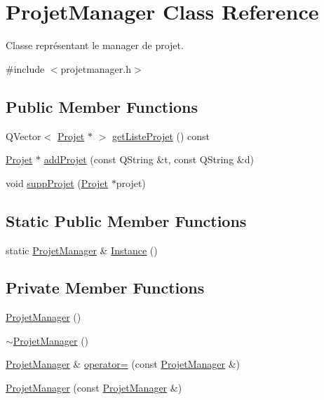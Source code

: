 \hypertarget{class_projet_manager}{}\section{Projet\+Manager Class Reference}
\label{class_projet_manager}


Classe représentant le manager de projet.  




{\ttfamily \#include $<$projetmanager.\+h$>$}

\subsection*{Public Member Functions}
\begin{DoxyCompactItemize}
\item 
Q\+Vector$<$ \hyperlink{class_projet}{Projet} $\ast$ $>$ \hyperlink{class_projet_manager_a2b7281842b818a8e2cd85a81ef270930}{get\+Liste\+Projet} () const 
\item 
\hyperlink{class_projet}{Projet} $\ast$ \hyperlink{class_projet_manager_a1c547839afb77faaa3eb2f37e0c869a7}{add\+Projet} (const Q\+String \&t, const Q\+String \&d)
\item 
void \hyperlink{class_projet_manager_a7c76e23d621d3e904e3e2a1bdc4c176c}{supp\+Projet} (\hyperlink{class_projet}{Projet} $\ast$projet)
\end{DoxyCompactItemize}
\subsection*{Static Public Member Functions}
\begin{DoxyCompactItemize}
\item 
static \hyperlink{class_projet_manager}{Projet\+Manager} \& \hyperlink{class_projet_manager_ad61417127cad478ea812d560b18b975d}{Instance} ()
\end{DoxyCompactItemize}
\subsection*{Private Member Functions}
\begin{DoxyCompactItemize}
\item 
\hyperlink{class_projet_manager_a98d8ba59bd9bc6eec2ec5285102ac9a1}{Projet\+Manager} ()
\item 
\hyperlink{class_projet_manager_af5a44cde2f8d92f05bb7e52a18aa883a}{$\sim$\+Projet\+Manager} ()
\item 
\hyperlink{class_projet_manager}{Projet\+Manager} \& \hyperlink{class_projet_manager_a25b560fb4e617952ad093bbe74315aaa}{operator=} (const \hyperlink{class_projet_manager}{Projet\+Manager} \&)
\item 
\hyperlink{class_projet_manager_abfdc065f2c1819e13c8adc1562536f35}{Projet\+Manager} (const \hyperlink{class_projet_manager}{Projet\+Manager} \&)
\end{DoxyCompactItemize}
